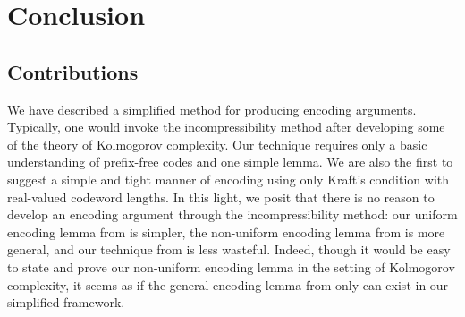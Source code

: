 \chapter{Conclusion}

\section{Contributions}

We have described a simplified method for producing encoding
arguments. Typically, one would invoke the incompressibility method
after developing some of the theory of Kolmogorov complexity. Our
technique requires only a basic understanding of prefix-free codes and
one simple lemma. We are also the first to suggest a simple and tight
manner of encoding using only Kraft's condition with real-valued
codeword lengths. In this light, we posit that there is no reason to
develop an encoding argument through the incompressibility method: our
uniform encoding lemma from  is simpler, the non-uniform
encoding lemma from  is more general, and our technique
from  is less wasteful. Indeed, though it would be easy to
state and prove our non-uniform encoding lemma in the setting of
Kolmogorov complexity, it seems as if the general encoding lemma from
 only can exist in our simplified framework.


